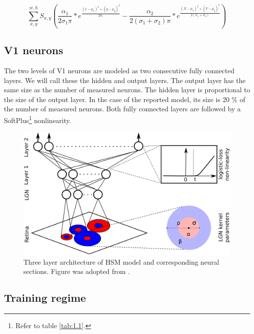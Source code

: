 \begin{equation}\label{eq:2.1}
    \sum_{x,y}^{w,h} S_{x,y}
(
{\frac{\alpha_1}{ 2 \sigma_1 \pi}} * e^{\frac{(x - \mu_x)^2 + (y - \mu_y)^2}{2\sigma_1}} -
{\frac{\alpha_2}{2 (\sigma_1+\sigma_2) \pi}} * e^{\frac{(X - \mu_x)^2 + (Y - \mu_y)^2}{ 2(\sigma_1+\sigma_2) }}
)
\end{equation}

\subsection{V1 neurons}
The two levels of V1 neurons are modeled as two consecutive fully connected layers. We will call these the hidden and output layers. The output layer has the same size as the number of measured neurons. The hidden layer is proportional to the size of the output layer. In the case of the reported model, its size is 20 \% of the number of measured neurons. Both fully connected layers are followed by a SoftPlus\footnote{Refer to table \ref{tab:1.1}.} nonlinearity.

\begin{figure}[h]
    \centering
    \includegraphics[width=1\textwidth]{../figures/02_HSM}
    \caption[HSM model architecture]{Three layer architecture of HSM model and corresponding neural sections. Figure was adopted from \cite{antolik}.}
    \label{fig:2.1}
\end{figure}

\subsection{Training regime}

